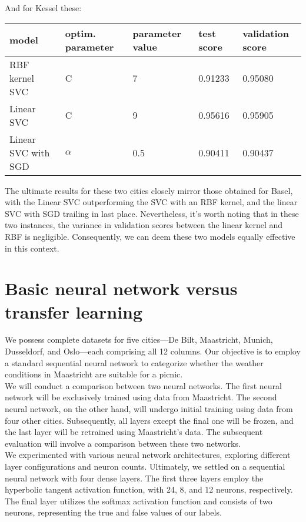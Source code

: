 \documentclass[a4paper]{article}
\begin{document}
	And for Kessel these:
	\begin{table}[!h]
		\begin{tabular}{|l|l|l|l|l|}
			\hline
			model & optim. parameter & parameter value & test score & validation score \\ \hline
			RBF kernel SVC & C & 7 & 0.91233 & 0.95080 \\ \hline
			Linear SVC & C & 9 & 0.95616 & 0.95905 \\ \hline
			Linear SVC with SGD& $\alpha$ & 0.5 & 0.90411 & 0.90437 \\ \hline
		\end{tabular}
	\end{table} 
	 
	The ultimate results for these two cities closely mirror those obtained for Basel, with the Linear SVC outperforming the SVC with an RBF kernel, and the linear SVC with SGD trailing in last place. Nevertheless, it's worth noting that in these two instances, the variance in validation scores between the linear kernel and RBF is negligible. Consequently, we can deem these two models equally effective in this context.
	
	\newpage

	\section{Basic neural network versus transfer learning}
	
	We possess complete datasets for five cities—De Bilt, Maastricht, Munich, Dusseldorf, and Oslo—each comprising all 12 columns. Our objective is to employ a standard sequential neural network to categorize whether the weather conditions in Maastricht are suitable for a picnic.
	\\
	
	We will conduct a comparison between two neural networks. The first neural network will be exclusively trained using data from Maastricht. The second neural network, on the other hand, will undergo initial training using data from four other cities. Subsequently, all layers except the final one will be frozen, and the last layer will be retrained using Maastricht's data. The subsequent evaluation will involve a comparison between these two networks.
	\\
	
	We experimented with various neural network architectures, exploring different layer configurations and neuron counts. Ultimately, we settled on a sequential neural network with four dense layers. The first three layers employ the hyperbolic tangent activation function, with 24, 8, and 12 neurons, respectively. The final layer utilizes the softmax activation function and consists of two neurons, representing the true and false values of our labels.    
	\\
	
\end{document}
